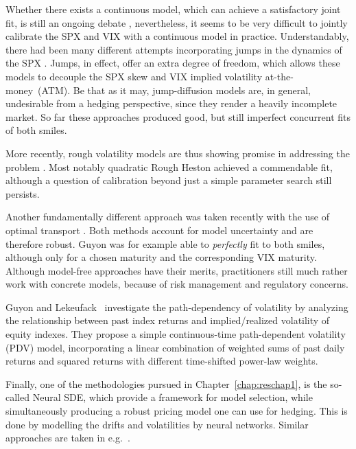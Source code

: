 Whether there exists a continuous model, which can achieve a satisfactory joint fit, is still an ongoing debate \cite{Acciaio2020ShortFutures, Guyon2019InversionMarket}, nevertheless, it seems to be very difficult to jointly calibrate the SPX and VIX with a continuous model in practice. Understandably, there had been many different attempts incorporating jumps in the dynamics of the SPX \cite{Cont2011ADERIVATIVES, Baldeaux2014ConsistentModel, Bardgett2013InferringMarkets, Papanicolaou2014AVolatilities, Kokholm2015JointModels, Pacati2018SmilingModel}. Jumps, in effect, offer an extra degree of freedom, which allows these models to decouple the SPX skew and VIX implied volatility at-the-money~(ATM). Be that as it may, jump-diffusion models are, in general, undesirable from a hedging perspective, since they render a heavily incomplete market. So far these approaches produced good, but still imperfect concurrent fits of both smiles.

More recently, rough volatility models are thus showing promise in addressing the problem \cite{Jacquier2021RoughOptions, Horvath2020VolatilityModels, DeMarco2018VolatilityModels}. Most notably quadratic Rough Heston \cite{Gatheral2020TheProblem} achieved a commendable fit, although a question of calibration beyond just a simple parameter search still persists.

Another fundamentally different approach was taken recently with the use of optimal transport \cite{Guyon2019TheSolved, Guo2020JointTransport}. Both methods account for model uncertainty and are therefore robust. Guyon \cite{Guyon2019TheSolved} was for example able to \textit{perfectly} fit to both smiles, although only for a chosen maturity and the corresponding VIX maturity. Although model-free approaches have their merits, practitioners still much rather work with concrete models, because of risk management and regulatory concerns. 

Guyon and Lekeufack~\cite{Guyon2022VolatilityPath-Dependent} investigate the path-dependency of volatility by analyzing the relationship between past index returns and implied/realized volatility of equity indexes. They propose a simple continuous-time path-dependent volatility (PDV) model, incorporating a linear combination of weighted sums of past daily returns and squared returns with different time-shifted power-law weights.

Finally, one of the methodologies pursued in Chapter~\ref{chap:reschap1}, is the so-called Neural SDE, which provide a framework for model selection, while simultaneously producing a robust pricing model one can use for hedging. This is done by modelling the drifts and volatilities by neural networks. Similar approaches are taken in e.g.~\cite{Guyon2022NeuralCalibration, Cuchiero2020AModels}.

